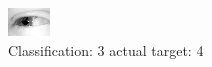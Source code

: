 \begin{figure}[h!]
\begin{center}
\includegraphics[width=0.60\columnwidth]{figures/ID2553_class_3_target_4.png}
\end{center}
\caption{ Classification: 3 actual target: 4}
\label{fig:ID2553_class_3_target_4}
\end{figure}

